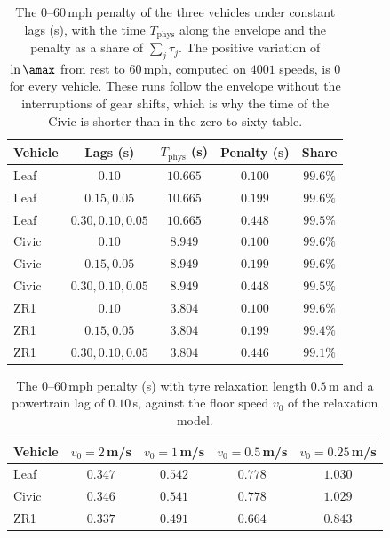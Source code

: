 \begin{table}[htbp]
\centering\small
\caption{The $0$--$60$\,mph penalty of the three vehicles under constant lags (s), with the time $T_{\mathrm{phys}}$ along the envelope and the penalty as a share of $\sum_j\tau_j$. The positive variation of $\ln\amax$ from rest to $60$\,mph, computed on $4001$ speeds, is $0$ for every vehicle. These runs follow the envelope without the interruptions of gear shifts, which is why the time of the Civic is shorter than in the zero-to-sixty table.}\label{tab:app-transient-veh}
\begin{tabular}{lcccc}
\toprule
Vehicle & Lags (s) & $T_{\mathrm{phys}}$ (s) & Penalty (s) & Share\\
\midrule
Leaf & $0.10$ & $10.665$ & $0.100$ & $99.6\%$\\
Leaf & $0.15, 0.05$ & $10.665$ & $0.199$ & $99.6\%$\\
Leaf & $0.30, 0.10, 0.05$ & $10.665$ & $0.448$ & $99.5\%$\\
Civic & $0.10$ & $8.949$ & $0.100$ & $99.6\%$\\
Civic & $0.15, 0.05$ & $8.949$ & $0.199$ & $99.6\%$\\
Civic & $0.30, 0.10, 0.05$ & $8.949$ & $0.448$ & $99.5\%$\\
ZR1 & $0.10$ & $3.804$ & $0.100$ & $99.6\%$\\
ZR1 & $0.15, 0.05$ & $3.804$ & $0.199$ & $99.4\%$\\
ZR1 & $0.30, 0.10, 0.05$ & $3.804$ & $0.446$ & $99.1\%$\\
\bottomrule
\end{tabular}
\end{table}

\begin{table}[htbp]
\centering\small
\caption{The $0$--$60$\,mph penalty (s) with tyre relaxation length $0.5$\,m and a powertrain lag of $0.10$\,s, against the floor speed $v_0$ of the relaxation model.}\label{tab:app-relax}
\begin{tabular}{lcccc}
\toprule
Vehicle & $v_0=2$\,m/s & $v_0=1$\,m/s & $v_0=0.5$\,m/s & $v_0=0.25$\,m/s\\
\midrule
Leaf & $0.347$ & $0.542$ & $0.778$ & $1.030$\\
Civic & $0.346$ & $0.541$ & $0.778$ & $1.029$\\
ZR1 & $0.337$ & $0.491$ & $0.664$ & $0.843$\\
\bottomrule
\end{tabular}
\end{table}
